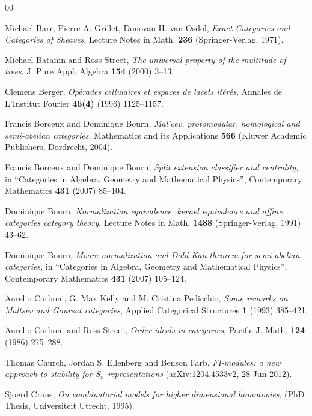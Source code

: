 \documentclass[a4paper,12pt,reqno]{amsart}
\theoremstyle{definition}
\theoremstyle{fact}
\theoremstyle{genquest}
\theoremstyle{step}
\begin{document}
\begin{thebibliography}{00}

 Michael Barr, Pierre A. Grillet, Donovan H. van Osdol, \textit{Exact Categories and Categories of Sheaves}, Lecture Notes in Math. \textbf{236} 
(Springer-Verlag, 1971).

 Michael Batanin and Ross Street, \textit{The universal property of the multitude of trees}, J. Pure Appl. Algebra \textbf{154} (2000) 3--13.\label{UPMT}

 Clemens Berger, \textit{Op\'erades cellulaires et espaces de lacets it\'er\'es}, Annales de L'Institut Fourier \textbf{46(4)} (1996) 1125--1157.\label{Berger1996} 

 Francis Borceux and Dominique Bourn, \textit{Mal'cev, protomodular, homological and semi-abelian categories}, Mathematics and its Applications \textbf{566} (Kluwer Academic Publishers, Dordrecht, 2004).

 Francis Borceux and Dominique Bourn, \textit{Split extension classifier and centrality}, in ``Categories in Algebra, Geometry and Mathematical Physics'', 
Contemporary Mathematics \textbf{431} (2007) 85--104.\label{BorBou07}

 Dominique Bourn, \textit{Normalization equivalence, kernel equivalence and affine categories category theory}, Lecture Notes in Math. \textbf{1488} (Springer-Verlag, 1991) 43--62.\label{Bourn91}

 Dominique Bourn, \textit{Moore normalization and Dold-Kan theorem for semi-abelian categories}, 
in ``Categories in Algebra, Geometry and Mathematical Physics'', 
Contemporary Mathematics \textbf{431} (2007) 105--124.\label{Bourn07}

 Aurelio Carboni, G. Max Kelly and M. Cristina Pedicchio, \textit{Some remarks on Maltsev and Goursat categories}, Applied Categorical Structures \textbf{1} (1993) 385--421.\label{CKP93}

 Aurelio Carboni and Ross Street, \textit{Order ideals in categories}, 
Pacific J. Math. \textbf{124} (1986) 275--288.\label{CarSt86}

 Thomas Church, Jordan S. Ellenberg and Benson Farb, \textit{FI-modules: a new approach to stability for $S_n$-representations} (\url{arXiv:1204.4533v2}, 28 Jun 2012).\label{CEF2012}

 Sjoerd Crans, \textit{On combinatorial models for higher dimensional homotopies}, (PhD Thesis, Universiteit Utrecht, 1995).\label{CransThesis}


\end{thebibliography}
\end{document}
